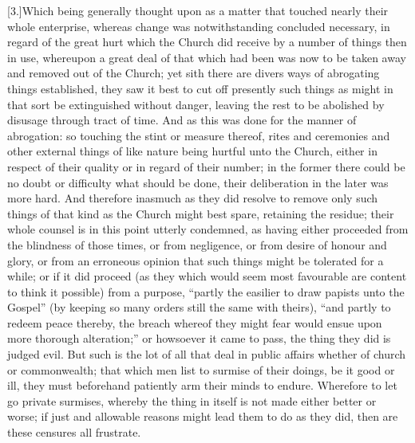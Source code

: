 [3.]Which being generally thought upon as a matter that touched nearly their whole enterprise, whereas change was notwithstanding concluded necessary, in regard of the great hurt which the Church did receive by a number of things then in use, whereupon a great deal of that which had been was now to be taken away and removed out of the Church; yet sith there are divers ways of abrogating things established, they saw it best to cut off presently such things as might in that sort be extinguished without danger, leaving the rest to be abolished by disusage through tract of time. And as this was done for the manner of abrogation: so touching the stint  or measure thereof, rites and ceremonies and other external things of like nature being hurtful unto the Church, either in respect of their quality or in regard of their number; in the former there could be no doubt or difficulty what should be done, their deliberation in the later was more hard. And therefore inasmuch as they did resolve to remove only such things of that kind as the Church might best spare, retaining the residue; their whole counsel is in this point utterly condemned, as having either proceeded from the blindness of those times, or from negligence, or from desire of honour and glory, or from an erroneous opinion that such things might be tolerated for a while; or if it did proceed (as they which would seem most favourable are content to think it possible) from a purpose, “partly the easilier to draw papists unto the Gospel” (by keeping so many orders still the same with theirs), “and partly to redeem peace thereby, the breach whereof they might fear would ensue upon more thorough alteration;” or howsoever it came to pass, the thing they did is judged evil. But such is the lot of all that deal in public affairs whether of church or commonwealth; that which men list to surmise of their doings, be it good or ill, they must beforehand patiently arm their minds to endure. Wherefore to let go private surmises, whereby the thing in itself is not made either better or worse; if just and allowable reasons might lead them to do as they did, then are these censures all frustrate.

